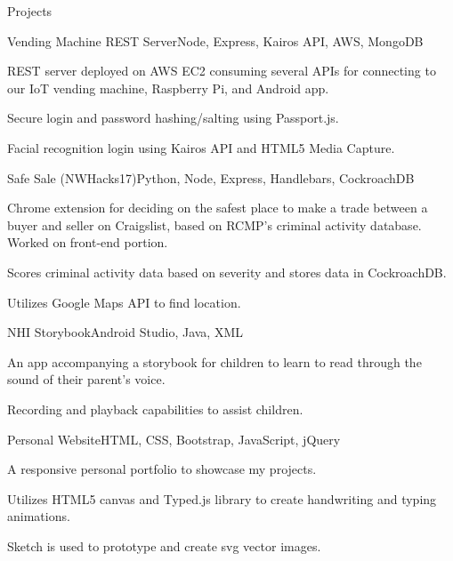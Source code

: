 \documentclass{resume} %
\begin{document}
\begin{rSection}{Projects}
\begin{multicols}{2}
\begin{rSubsection}{Vending Machine REST Server}{}{Node, Express, Kairos API, AWS, MongoDB}{}
  \item REST server deployed on AWS EC2 consuming several APIs for connecting to our IoT vending machine, Raspberry Pi, and Android app.
  \item Secure login and password hashing/salting using Passport.js.
  \item Facial recognition login using Kairos API and HTML5 Media Capture.
\end{rSubsection}
\columnbreak %
  \begin{rSubsection}{Safe Sale (NWHacks17)}{}{Python, Node, Express, Handlebars, CockroachDB}{}
  \item Chrome extension for deciding on the safest place to make a trade between a buyer and seller on Craigslist, based on RCMP's criminal activity database. Worked on front-end portion.
  \item Scores criminal activity data based on severity and stores data in CockroachDB.
  \item Utilizes Google Maps API to find location.
\end{rSubsection}
\end{multicols}


\begin{multicols}{2}
\begin{rSubsection}{NHI Storybook}{}{Android Studio, Java, XML}{}
  \item An app accompanying a storybook for children to learn to read through the sound of their parent's voice.
  \item Recording and playback capabilities to assist children.
\end{rSubsection}
\columnbreak %
  \begin{rSubsection}{Personal Website}{}{HTML, CSS, Bootstrap, JavaScript, jQuery}{}
  \item A responsive personal portfolio to showcase my projects.
  \item Utilizes HTML5 canvas and Typed.js library to create handwriting and typing animations.
  \item Sketch is used to prototype and create svg vector images.
\end{rSubsection}
\end{multicols}

\end{rSection}
\end{document}
